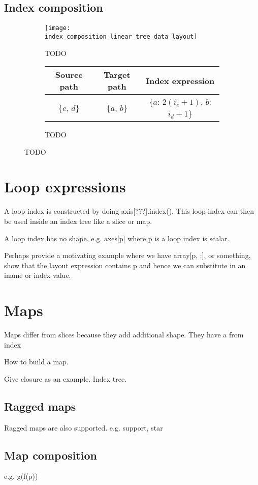 \documentclass[thesis]{subfiles}
\begin{document}
\subsection{Index composition}
\label{sec:index_composition}

\begin{figure}
  \centering
  \begin{subfigure}{\textwidth}
    \centering
    \texttt{[image: index\_composition\_linear\_tree\_data\_layout]}
    \caption{TODO}
    \label{fig:index_composition_linear_tree_data_layout}
  \end{subfigure}

  \vspace{1em}

  \begin{subfigure}{\textwidth}
    \centering
    \begin{tabular}{c|c|c}
      \textbf{Source path} & \textbf{Target path} & \textbf{Index expression} \\
      \hline
      \{$e$, $d$\} & \{$a$, $b$\} & \{$a$: $2 (i_e+1)$, $b$: $i_d+1$\} \\
    \end{tabular}
    \caption{TODO}
    \label{fig:index_composition_linear_tree_exprs}
  \end{subfigure}

  \caption{TODO}
  \label{fig:index_composition_linear_tree_all}
\end{figure}

\section{Loop expressions}


A loop index is constructed by doing axis[???].index().
This loop index can then be used inside an index tree like a slice or map.

A loop index has no shape. e.g. axes[p] where p is a loop index is scalar.

Perhaps provide a motivating example where we have array[p, :], or something, show that the layout expression contains p and hence we can substitute in an iname or index value.


\section{Maps}

Maps differ from slices because they add additional shape. They have a from index

How to build a map.

Give closure as an example. Index tree.

\subsection{Ragged maps}

Ragged maps are also supported. e.g. support, star

\subsection{Map composition}

e.g. g(f(p))
\end{document}
